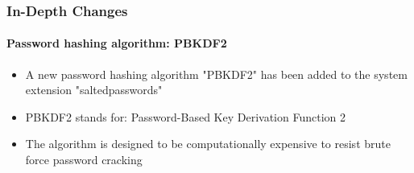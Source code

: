 \begin{frame}[fragile]
	\frametitle{In-Depth Changes}
	\framesubtitle{Password hashing algorithm: PBKDF2}

	\begin{itemize}

		\item A new password hashing algorithm "PBKDF2" has been added to the system extension "saltedpasswords"

		\item PBKDF2 stands for: Password-Based Key Derivation Function 2

		\item The algorithm is designed to be computationally expensive to resist brute force password cracking

	\end{itemize}

\end{frame}

